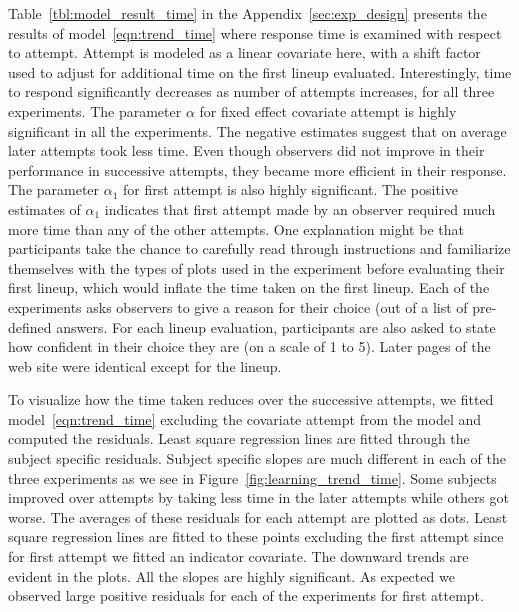 \documentclass[10pt]{article}\usepackage[]{graphicx}\usepackage[]{xcolor}
\begin{document}
Table~\ref{tbl:model_result_time} in the Appendix~\ref{sec:exp_design} presents the results of model~\eqref{eqn:trend_time} where response time is examined with respect to attempt. Attempt is modeled as a linear covariate here, with a shift factor used to adjust for additional time on the first lineup evaluated. Interestingly, time to respond significantly decreases as number of attempts increases, for all three experiments. 
The parameter $\alpha$ for fixed effect covariate attempt is highly significant in all the experiments. The negative estimates suggest that on average later attempts took less time. Even though observers did not improve in their performance in successive attempts, they became more efficient in their response. The parameter $\alpha_1$ for first attempt is also highly significant. The positive estimates of $\alpha_1$ indicates that first attempt made by an observer required much more time than any of the other attempts. One explanation might be that participants take the chance to  carefully read through instructions and familiarize themselves  with the types of plots used in the experiment before evaluating their first lineup, which would inflate the time taken on the first lineup. Each of the experiments asks observers to give a reason for their choice (out of a list of pre-defined answers. For each lineup evaluation, participants are also asked to state how confident in their choice they are (on a scale of 1 to 5).  Later pages of the web site were identical  except for the lineup. 


To visualize how the time taken reduces over the successive attempts, we fitted model~\eqref{eqn:trend_time} excluding the covariate attempt from the model and computed the residuals. Least square regression lines are fitted through the subject specific residuals. Subject specific slopes are much different in each of the three experiments as we see in Figure~\ref{fig:learning_trend_time}. Some subjects improved over attempts by taking less time in the later attempts while others got worse. The averages of these residuals for each attempt are plotted as dots. Least square regression lines are fitted to these points excluding the first attempt since for first attempt we fitted an indicator covariate. The downward trends are evident in the plots. All the slopes are highly significant. As expected we observed large positive residuals for each of the experiments for first attempt. 
\end{document}
